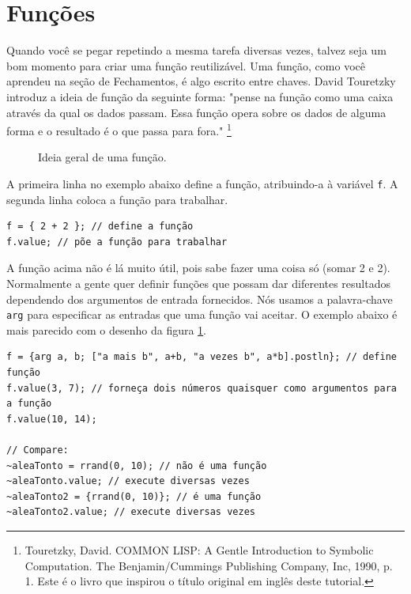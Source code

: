 \section{Funções}
\label{sec:functions}

Quando você se pegar repetindo a mesma tarefa diversas vezes, talvez seja um bom momento para criar uma função reutilizável. Uma função, como você aprendeu na seção de Fechamentos, é algo escrito entre chaves. David Touretzky introduz a ideia de função da seguinte forma: "pense na função como uma caixa através da qual os dados passam. Essa função opera sobre os dados de alguma forma e o resultado é o que passa para fora." \footnote{Touretzky, David. COMMON LISP: A Gentle Introduction to Symbolic Computation. The Benjamin/Cummings Publishing Company, Inc, 1990, p. 1. Este é o livro que inspirou o título original em inglês deste tutorial.}

\begin{figure}[h]
\centerline{}
\caption{Ideia geral de uma função.}
\label{fig:function-box}
\end{figure}

A primeira linha no exemplo abaixo define a função, atribuindo-a à variável \texttt{f}. A segunda linha coloca a função para trabalhar.

 
\begin{lstlisting}[style=SuperCollider-IDE, basicstyle=\scttfamily\footnotesize]
f = { 2 + 2 }; // define a função
f.value; // põe a função para trabalhar
\end{lstlisting}
 
A função acima não é lá muito útil, pois sabe fazer uma coisa só (somar 2 e 2). Normalmente a gente quer definir funções que possam dar diferentes resultados dependendo dos argumentos de entrada fornecidos. Nós usamos a palavra-chave \texttt{arg} para especificar as entradas que uma função vai aceitar. O exemplo abaixo é mais parecido com o desenho da figura \ref{fig:function-box}.
 
\begin{lstlisting}[style=SuperCollider-IDE, basicstyle=\scttfamily\footnotesize]
f = {arg a, b; ["a mais b", a+b, "a vezes b", a*b].postln}; // define função
f.value(3, 7); // forneça dois números quaisquer como argumentos para a função
f.value(10, 14);

// Compare:
~aleaTonto = rrand(0, 10); // não é uma função
~aleaTonto.value; // execute diversas vezes
~aleaTonto2 = {rrand(0, 10)}; // é uma função
~aleaTonto2.value; // execute diversas vezes
\end{lstlisting}
 
